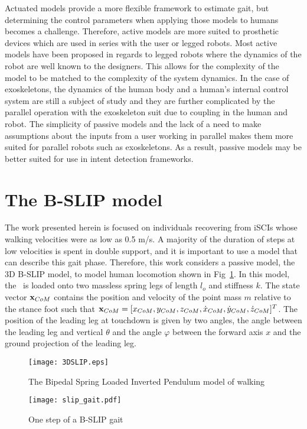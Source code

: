 Actuated models provide a more flexible framework to estimate gait, but determining the control parameters when applying those models to humans becomes a challenge. Therefore, active models are more suited to prosthetic devices which are used in series with the user or legged robots. Most active models have been proposed in regards to legged robots where the dynamics of the robot are well known to the designers. This allows for the complexity of the model to be matched to the complexity of the system dynamics. In the case of exoskeletons, the dynamics of the human body and a human's internal control system \cite{wolpert1998internal, dounskaia2005internal, kording2007decision} are still a subject of study and they are further complicated by the parallel operation with the exoskeleton suit due to coupling in the human and robot. The simplicity of passive models and the lack of a need to make assumptions about the inputs from a user working in parallel makes them more suited for parallel robots such as exoskeletons. As a result, passive models may be better suited for use in intent detection frameworks. 

\section{The B-SLIP model}\label{sec:bslip_model}
The work presented herein is focused on individuals recovering from iSCIs whose walking velocities were as low as 0.5 m/s. A majority of the duration of steps at low velocities is spent in double support, and it is important to use a model that can describe this gait phase. Therefore, this work considers a passive model, the 3D B-SLIP model, to model human locomotion shown in Fig~\ref{fig:slip}. In this model, the \COM~is loaded onto two massless spring legs of length $ l_o $ and stiffness $ k $. The state vector $ \mathbf{x}_{CoM} $ contains the position and velocity of the point mass $ m $ relative to the stance foot such that $ \mathbf{x}_{CoM} = [x_{CoM} ,y_{CoM} ,z_{CoM} ,\dot{x}_{CoM} ,\dot{y}_{CoM} ,\dot{z}_{CoM}]^T $. The position of the leading leg at touchdown is given by two angles, the angle between the leading leg and vertical $ \theta $ and the angle $ \varphi $ between the forward axis $ x $  and the ground projection of the leading leg.
%
\begin{figure}
	\centering
	\texttt{[image: 3DSLIP.eps]}
	\caption[The Bipedal Spring Loaded Inverted Pendulum]{The Bipedal Spring Loaded Inverted Pendulum \cite{liu2015dynamic} model of walking}\label{fig:slip}
\end{figure}
%
\begin{figure}
	\centering
	\texttt{[image: slip\_gait.pdf]}
	\caption{One step of a B-SLIP gait}\label{fig:slip_gait}
\end{figure} 
%

